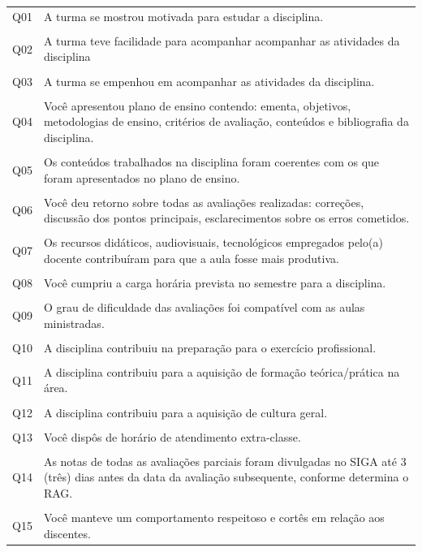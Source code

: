 \documentclass[a4paper,10pt]{article}
\begin{document}
\begin{center}
\small{
\begin{tabularx}{\linewidth}{c|X}
Q01&A turma se mostrou motivada para estudar a disciplina.\\\\
Q02&A turma teve facilidade para acompanhar acompanhar as atividades da disciplina\\\\
Q03&A turma se empenhou em acompanhar as atividades da disciplina.\\\\
Q04&Você apresentou plano de ensino contendo: ementa, objetivos, metodologias de ensino, critérios de avaliação, conteúdos e bibliografia da disciplina.\\\\
Q05&Os conteúdos trabalhados na disciplina foram coerentes com os que foram apresentados no plano de ensino.\\\\
Q06&Você deu retorno sobre todas as avaliações realizadas: correções, discussão dos pontos principais, esclarecimentos sobre os erros cometidos.\\\\
Q07&Os recursos didáticos, audiovisuais, tecnológicos empregados pelo(a) docente contribuíram para que a aula fosse mais produtiva.\\\\
Q08&Você cumpriu a carga horária prevista no semestre para a disciplina.\\\\
Q09&O grau de dificuldade das avaliações foi compatível com as aulas ministradas.\\\\
Q10&A disciplina contribuiu na preparação para o exercício profissional.\\\\
Q11&A disciplina contribuiu para a aquisição de formação teórica/prática na área. \\\\
Q12&A disciplina contribuiu para a aquisição de cultura geral.\\\\
Q13&Você dispôs de horário de atendimento extra-classe.\\\\
Q14& As notas de todas as avaliações parciais foram divulgadas no SIGA até 3 (três) dias antes da data da avaliação subsequente, conforme determina o RAG. \\\\
Q15&Você manteve um comportamento respeitoso e cortês em relação aos discentes.
\end{tabularx}
}
\end{center}
\end{document}
